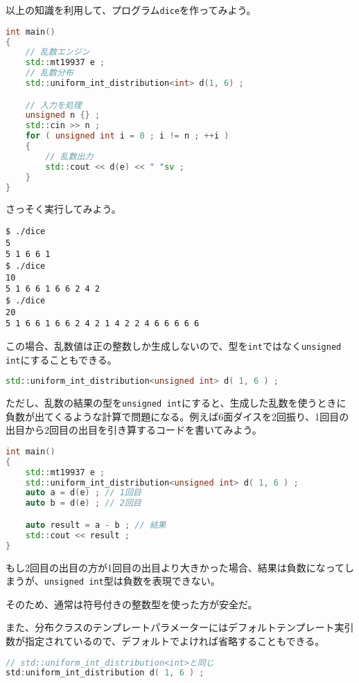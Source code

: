 以上の知識を利用して、プログラム\texttt{dice}を作ってみよう。

\begin{lstlisting}[language={C++}]
int main()
{
    // 乱数エンジン
    std::mt19937 e ;
    // 乱数分布
    std::uniform_int_distribution<int> d(1, 6) ;

    // 入力を処理
    unsigned n {} ;
    std::cin >> n ;
    for ( unsigned int i = 0 ; i != n ; ++i )
    {
        // 乱数出力
        std::cout << d(e) << " "sv ;
    }
}
\end{lstlisting}

さっそく実行してみよう。

\begin{lstlisting}[style=terminal]
$ ./dice
5
5 1 6 6 1
$ ./dice
10
5 1 6 6 1 6 6 2 4 2
$ ./dice
20
5 1 6 6 1 6 6 2 4 2 1 4 2 2 4 6 6 6 6 6
\end{lstlisting}

この場合、乱数値は正の整数しか生成しないので、型を\texttt{int}ではなく\texttt{unsigned int}にすることもできる。

\begin{lstlisting}[language={C++}]
std::uniform_int_distribution<unsigned int> d( 1, 6 ) ;
\end{lstlisting}

ただし、乱数の結果の型を\texttt{unsigned int}にすると、生成した乱数を使うときに負数が出てくるような計算で問題になる。例えば6面ダイスを2回振り、1回目の出目から2回目の出目を引き算するコードを書いてみよう。

\begin{lstlisting}[language={C++}]
int main()
{
    std::mt19937 e ;
    std::uniform_int_distribution<unsigned int> d( 1, 6 ) ;
    auto a = d(e) ; // 1回目
    auto b = d(e) ; // 2回目

    auto result = a - b ; // 結果
    std::cout << result ;
}
\end{lstlisting}

もし2回目の出目の方が1回目の出目より大きかった場合、結果は負数になってしまうが、\texttt{unsigned int}型は負数を表現できない。

そのため、通常は符号付きの整数型を使った方が安全だ。

また、分布クラスのテンプレートパラメーターにはデフォルトテンプレート実引数が指定されているので、デフォルトでよければ省略することもできる。

\begin{lstlisting}[language={C++}]
// std::uniform_int_distribution<int>と同じ
std:uniform_int_distribution d( 1, 6 ) ;
\end{lstlisting}

